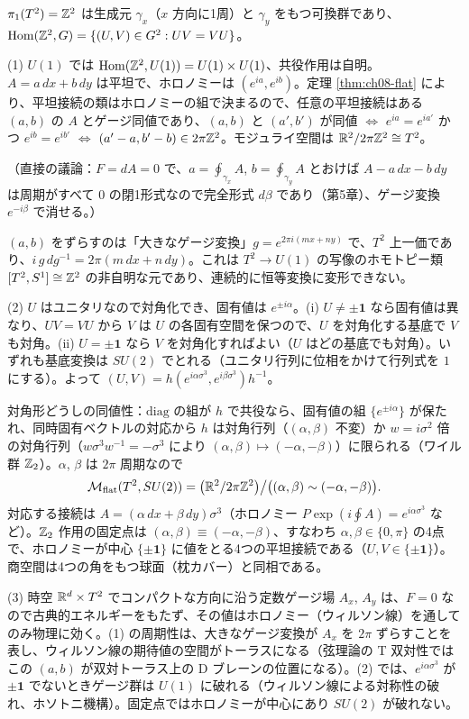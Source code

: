 \begin{solution}
$\pi_1(T^2)=\mathbb{Z}^2$ は生成元 $\gamma_x$（$x$ 方向に1周）と $\gamma_y$ をもつ可換群であり、$\operatorname{Hom}(\mathbb{Z}^2,G)=\{(U,V)\in G^2:UV=VU\}$。

(1) $U(1)$ では $\operatorname{Hom}(\mathbb{Z}^2,U(1))=U(1)\times U(1)$、共役作用は自明。$A=a\,dx+b\,dy$ は平坦で、ホロノミーは $(e^{ia},e^{ib})$。定理 \ref{thm:ch08-flat} により、平坦接続の類はホロノミーの組で決まるので、任意の平坦接続はある $(a,b)$ の $A$ とゲージ同値であり、$(a,b)$ と $(a',b')$ が同値 $\iff$ $e^{ia}=e^{ia'}$ かつ $e^{ib}=e^{ib'}$ $\iff$ $(a'-a,b'-b)\in2\pi\mathbb{Z}^2$。モジュライ空間は $\mathbb{R}^2/2\pi\mathbb{Z}^2\cong T^2$。

（直接の議論：$F=dA=0$ で、$a=\oint_{\gamma_x}A$, $b=\oint_{\gamma_y}A$ とおけば $A-a\,dx-b\,dy$ は周期がすべて $0$ の閉1形式なので完全形式 $d\beta$ であり（第5章）、ゲージ変換 $e^{-i\beta}$ で消せる。）

$(a,b)$ をずらすのは「大きなゲージ変換」$g=e^{2\pi i(mx+ny)}$ で、$T^2$ 上一価であり、$i\,g\,dg^{-1}=2\pi(m\,dx+n\,dy)$。これは $T^2\to U(1)$ の写像のホモトピー類 $[T^2,S^1]\cong\mathbb{Z}^2$ の非自明な元であり、連続的に恒等変換に変形できない。

(2) $U$ はユニタリなので対角化でき、固有値は $e^{\pm i\alpha}$。(i) $U\ne\pm\mathbf 1$ なら固有値は異なり、$UV=VU$ から $V$ は $U$ の各固有空間を保つので、$U$ を対角化する基底で $V$ も対角。(ii) $U=\pm\mathbf 1$ なら $V$ を対角化すればよい（$U$ はどの基底でも対角）。いずれも基底変換は $SU(2)$ でとれる（ユニタリ行列に位相をかけて行列式を $1$ にする）。よって $(U,V)=h(e^{i\alpha\sigma^3},e^{i\beta\sigma^3})h^{-1}$。

対角形どうしの同値性：$\mathrm{diag}$ の組が $h$ で共役なら、固有値の組 $\{e^{\pm i\alpha}\}$ が保たれ、同時固有ベクトルの対応から $h$ は対角行列（$(\alpha,\beta)$ 不変）か $w=i\sigma^2$ 倍の対角行列（$w\sigma^3w^{-1}=-\sigma^3$ により $(\alpha,\beta)\mapsto(-\alpha,-\beta)$）に限られる（ワイル群 $\mathbb{Z}_2$）。$\alpha$, $\beta$ は $2\pi$ 周期なので
\[
\mathcal M_{\text{flat}}(T^2,SU(2))=\bigl(\mathbb{R}^2/2\pi\mathbb{Z}^2\bigr)\big/\bigl((\alpha,\beta)\sim(-\alpha,-\beta)\bigr).
\]
対応する接続は $A=(\alpha\,dx+\beta\,dy)\sigma^3$（ホロノミー $P\exp(i\oint A)=e^{i\alpha\sigma^3}$ など）。$\mathbb{Z}_2$ 作用の固定点は $(\alpha,\beta)\equiv(-\alpha,-\beta)$、すなわち $\alpha,\beta\in\{0,\pi\}$ の4点で、ホロノミーが中心 $\{\pm\mathbf 1\}$ に値をとる4つの平坦接続である（$U,V\in\{\pm\mathbf 1\}$）。商空間は4つの角をもつ球面（枕カバー）と同相である。

(3) 時空 $\mathbb{R}^{d}\times T^2$ でコンパクトな方向に沿う定数ゲージ場 $A_x$, $A_y$ は、$F=0$ なので古典的エネルギーをもたず、その値はホロノミー（ウィルソン線）を通してのみ物理に効く。(1) の周期性は、大きなゲージ変換が $A_x$ を $2\pi$ ずらすことを表し、ウィルソン線の期待値の空間がトーラスになる（弦理論の T 双対性ではこの $(a,b)$ が双対トーラス上の D ブレーンの位置になる）。(2) では、$e^{i\alpha\sigma^3}$ が $\pm\mathbf 1$ でないときゲージ群は $U(1)$ に破れる（ウィルソン線による対称性の破れ、ホソトニ機構）。固定点ではホロノミーが中心にあり $SU(2)$ が破れない。
\end{solution}

